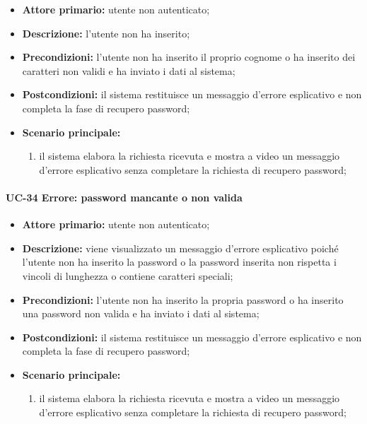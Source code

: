 	\begin{itemize}
		\item \textbf{Attore primario:} utente non autenticato;

		\item \textbf{Descrizione:} l'utente non ha inserito;

		\item \textbf{Precondizioni:} l'utente non ha inserito il proprio cognome o ha inserito dei caratteri non validi e ha inviato i dati al sistema;

		\item \textbf{Postcondizioni:} il sistema restituisce un messaggio d'errore esplicativo e non completa la fase di recupero password;

		\item \textbf{Scenario principale:}
	  		\begin{enumerate}
		  		\item il sistema elabora la richiesta ricevuta e mostra a video un messaggio d'errore esplicativo senza completare la richiesta di recupero password; 
	  		\end{enumerate}
	\end{itemize}

\paragraph{UC-34 Errore: password mancante o non valida}

	\begin{itemize}
		\item \textbf{Attore primario:} utente non autenticato;

		\item \textbf{Descrizione:} viene visualizzato un messaggio d'errore esplicativo poiché l'utente non ha inserito la password o la password inserita non rispetta i vincoli di lunghezza o contiene caratteri speciali;

		\item \textbf{Precondizioni:} l'utente non ha inserito la propria password o ha inserito una password non valida e ha inviato i dati al sistema;

		\item \textbf{Postcondizioni:} il sistema restituisce un messaggio d'errore esplicativo e non completa la fase di recupero password;

		\item \textbf{Scenario principale:}
	  		\begin{enumerate}
		  		\item il sistema elabora la richiesta ricevuta e mostra a video un messaggio d'errore esplicativo senza completare la richiesta di recupero password; 
	  		\end{enumerate}
	\end{itemize}


